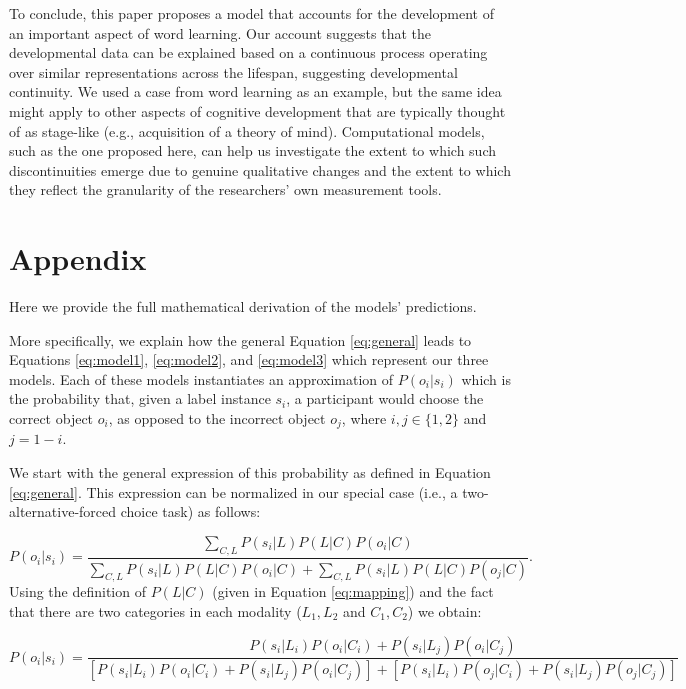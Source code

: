 \documentclass[english,,man]{apa6}
\begin{document}
To conclude, this paper proposes a model that accounts for the development of an important aspect of word learning. Our account suggests that the developmental data can be explained based on a continuous process operating over similar representations across the lifespan, suggesting developmental continuity. We used a case from word learning as an example, but the same idea might apply to other aspects of cognitive development that are typically thought of as stage-like (e.g., acquisition of a theory of mind). Computational models, such as the one proposed here, can help us investigate the extent to which such discontinuities emerge due to genuine qualitative changes and the extent to which they reflect the granularity of the researchers' own measurement tools.

\hypertarget{appendix}{%
\section{Appendix}\label{appendix}}

Here we provide the full mathematical derivation of the models' predictions.

More specifically, we explain how the general Equation \ref{eq:general} leads to Equations \ref{eq:model1}, \ref{eq:model2}, and \ref{eq:model3} which represent our three models. Each of these models instantiates an approximation of \(P(o_i|s_i)\) which is the probability that, given a label instance \(s_i\), a participant would choose the correct object \(o_i\), as opposed to the incorrect object \(o_{j}\), where \(i, j \in \{1,2\}\) and \(j = 1-i\).

We start with the general expression of this probability as defined in Equation \ref{eq:general}. This expression can be normalized in our special case (i.e., a two-alternative-forced choice task) as follows:

\[P(o_i|s_i) = \frac{\sum_{C,L} P(s_i|L)P(L|C)P(o_i|C)}{\sum_{C,L}  P(s_i|L)P(L|C)P(o_i|C) + \sum_{C,L}  P(s_i|L)P(L|C)P(o_j|C)}.\]
Using the definition of \(P(L|C)\) (given in Equation \ref{eq:mapping}) and the fact that there are two categories in each modality (\(L_1, L_2\) and \(C_1, C_2\)) we obtain:

\begin{equation} \label{eq:special}
P(o_i|s_i) = \frac{P(s_i|L_i)P(o_i|C_i) + P(s_i|L_j)P(o_i|C_j)}{[P(s_i|L_i)P(o_i|C_i) + P(s_i|L_j)P(o_i|C_j)] + [P(s_i|L_i)P(o_j|C_i) + P(s_i|L_j)P(o_j|C_j)]}
\end{equation}
\end{document}
